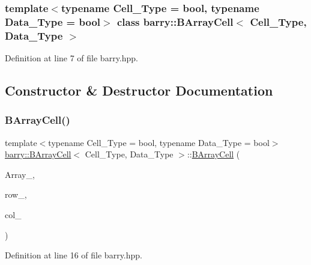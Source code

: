\subsubsection*{template$<$typename Cell\+\_\+\+Type = bool, typename Data\+\_\+\+Type = bool$>$\newline
class barry\+::\+B\+Array\+Cell$<$ Cell\+\_\+\+Type, Data\+\_\+\+Type $>$}



Definition at line 7 of file barry.\+hpp.



\subsection{Constructor \& Destructor Documentation}
\mbox{\label{classbarry_1_1_b_array_cell_aab9b5eb008b588acf592782fdb5bd543}} 
\subsubsection{\texorpdfstring{B\+Array\+Cell()}{BArrayCell()}}
{\footnotesize\ttfamily template$<$typename Cell\+\_\+\+Type  = bool, typename Data\+\_\+\+Type  = bool$>$ \\
\hyperlink{classbarry_1_1_b_array_cell}{barry\+::\+B\+Array\+Cell}$<$ Cell\+\_\+\+Type, Data\+\_\+\+Type $>$\+::\hyperlink{classbarry_1_1_b_array_cell}{B\+Array\+Cell} (\begin{DoxyParamCaption}\item[{\hyperlink{classbarry_1_1_b_array}{B\+Array}$<$ Cell\+\_\+\+Type, Data\+\_\+\+Type $>$ $\ast$}]{Array\+\_\+,  }\item[{\hyperlink{namespacebarry_a11dfc53ddb4672278319aa04f1e09a6c}{uint}}]{row\+\_\+,  }\item[{\hyperlink{namespacebarry_a11dfc53ddb4672278319aa04f1e09a6c}{uint}}]{col\+\_\+ }\end{DoxyParamCaption})\hspace{0.3cm}{\ttfamily [inline]}}



Definition at line 16 of file barry.\+hpp.

\mbox{\label{classbarry_1_1_b_array_cell_a6d5c31a74e666b22889e81ca1b40c66b}} 
